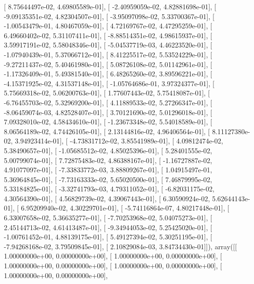 \documentclass{article}
\begin{document}
       [  8.75644497e-02,   4.69805589e-01],
       [ -2.40959059e-02,   4.82881698e-01],
       [ -9.09135351e-02,   4.82304507e-01],
       [ -3.95097098e-02,   5.33700367e-01],
       [ -1.00543479e-01,   4.80467059e-01],
       [  4.72169767e-02,   4.47295259e-01],
       [  6.49660402e-02,   5.31107411e-01],
       [ -8.88514351e-02,   4.98615937e-01],
       [  3.59917191e-02,   5.58048346e-01],
       [ -5.04537719e-03,   4.46223520e-01],
       [ -1.07940439e-01,   5.37066712e-01],
       [  8.41225517e-02,   5.53524229e-01],
       [ -9.27211437e-02,   5.40461980e-01],
       [  5.08726108e-02,   5.01142961e-01],
       [ -1.17326409e-01,   5.49381540e-01],
       [  6.48265260e-02,   3.89596221e-01],
       [ -4.15371925e-02,   4.31537148e-01],
       [ -1.05764686e-01,   3.97324377e-01],
       [  5.75669318e-02,   5.06200763e-01],
       [  1.77607443e-02,   5.75418087e-01],
       [ -6.76455703e-02,   5.32969200e-01],
       [  4.11889533e-02,   5.27266347e-01],
       [ -8.06459074e-03,   4.82528407e-01],
       [  3.70121690e-02,   5.01296018e-01],
       [  7.09328010e-02,   4.58434610e-01],
       [ -1.23673348e-02,   5.54018589e-01],
       [  8.06564189e-02,   4.74426105e-01],
       [  2.13144816e-02,   4.96406564e-01],
       [  8.11127380e-02,   3.94923414e-01],
       [ -4.73831712e-02,   3.85541989e-01],
       [  4.09812474e-02,   5.38490657e-01],
       [ -1.05685512e-02,   4.85025396e-01],
       [  5.28401555e-02,   5.00799074e-01],
       [  7.72875483e-02,   4.86388167e-01],
       [ -1.16727887e-02,   4.91077097e-01],
       [ -7.33833772e-03,   3.88809267e-01],
       [  1.04915497e-01,   5.36964845e-01],
       [ -7.73163333e-02,   5.65020500e-01],
       [  7.46879995e-02,   5.33184825e-01],
       [ -3.32741793e-03,   4.79311052e-01],
       [ -6.82031175e-02,   4.30564390e-01],
       [  4.56829739e-02,   4.39067443e-01],
       [  6.30590924e-02,   5.62644143e-01],
       [  6.95209940e-02,   4.30229701e-01],
       [ -5.74116864e-07,   4.80217448e-01],
       [  6.33007658e-02,   5.36635277e-01],
       [ -7.70253968e-02,   5.04075273e-01],
       [  2.45144713e-02,   4.61413487e-01],
       [ -9.34944053e-02,   5.25425020e-01],
       [ -1.00761452e-01,   4.88139175e-01],
       [  5.49127394e-02,   5.30251195e-01],
       [ -7.94268168e-02,   3.79509845e-01],
       [  2.10829084e-03,   3.84734430e-01]]), array([[  1.00000000e+00,   0.00000000e+00],
       [  1.00000000e+00,   0.00000000e+00],
       [  1.00000000e+00,   0.00000000e+00],
       [  1.00000000e+00,   0.00000000e+00],
       [  1.00000000e+00,   0.00000000e+00],
\end{document}
